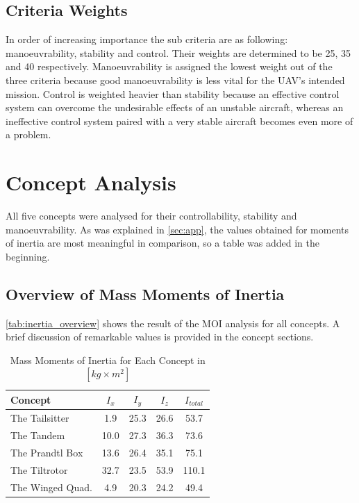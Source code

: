 \subsection{Criteria Weights}
In order of increasing importance the sub criteria are as following: manoeuvrability, stability and control. Their weights are determined to be 25, 35 and 40 respectively. Manoeuvrability is assigned the lowest weight out of the three criteria because good manoeuvrability is less vital for the UAV's intended mission. Control is weighted heavier than stability because an effective control system can overcome the undesirable effects of an unstable aircraft, whereas an ineffective control system paired with a very stable aircraft becomes even more of a problem. 

\section{Concept Analysis}
\label{sec:ca}

All five concepts were analysed for their controllability, stability and manoeuvrability. As was explained in \autoref{sec:app}, the values obtained for moments of inertia are most meaningful in comparison, so a table was added in the beginning. 

\subsection{Overview of Mass Moments of Inertia}

\autoref{tab:inertia_overview} shows the result of the MOI analysis for all concepts. A brief discussion of remarkable values is provided in the concept sections. 

\begin{table}[htb]
    \centering
    \caption{Mass Moments of Inertia for Each Concept in $[kg \times m^2]$ }
    \label{tab:inertia_overview}
    \small
        \begin{tabular}{lcccc}
        \toprule
        \textbf{Concept} & \textbf{$I_x$} & \textbf{$I_y$} & \textbf{$I_z$} & \textbf{$I_{total}$} \\ \midrule
        The Tailsitter          &1.9   & 25.3  & 26.6 & 53.7    \\\hdashline
        The Tandem              &10.0  & 27.3  & 36.3 & 73.6    \\\hdashline
        The Prandtl Box         &13.6  & 26.4  & 35.1 & 75.1    \\\hdashline
        The Tiltrotor           &32.7  & 23.5  & 53.9 & 110.1   \\\hdashline
        The Winged Quad.        &4.9   & 20.3  & 24.2 & 49.4    \\\bottomrule
        \end{tabular}
\end{table}


